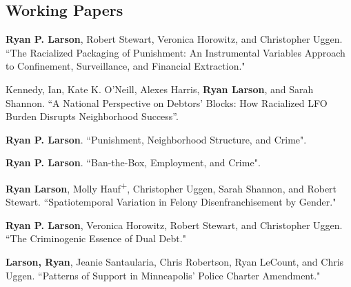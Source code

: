 \documentclass[letterpaper]{article}
\renewenvironment{itemize}{
  \begin{list}{}{
    \setlength{\leftmargin}{1.5em}
  }
}{
  \end{list}
}
\begin{document}
\subsection*{Working Papers}
\begin{itemize}

\item \textbf{Ryan P. Larson}, Robert Stewart, Veronica Horowitz, and Christopher Uggen. ``The Racialized Packaging of Punishment: An Instrumental Variables Approach to Confinement, Surveillance, and Financial Extraction." 
\item Kennedy, Ian, Kate K. O’Neill, Alexes Harris, \textbf{Ryan Larson}, and Sarah Shannon. “A National Perspective on Debtors’ Blocks: How Racialized LFO Burden Disrupts Neighborhood Success”.
\item \textbf{Ryan P. Larson}. ``Punishment, Neighborhood Structure, and Crime".
\item \textbf{Ryan P. Larson}. ``Ban-the-Box, Employment, and Crime".
\item \textbf{Ryan Larson}, Molly Hauf\textsuperscript{+}, Christopher Uggen, Sarah Shannon, and Robert Stewart. ``Spatiotemporal Variation in Felony Disenfranchisement by Gender."
\item \textbf{Ryan P. Larson}, Veronica Horowitz, Robert Stewart, and Christopher Uggen. ``The Criminogenic Essence of Dual Debt."
\item \textbf{Larson, Ryan}, Jeanie Santaularia, Chris Robertson, Ryan LeCount, and Chris Uggen.  ``Patterns of Support in Minneapolis’ Police Charter Amendment." 






\end{itemize}
\end{document}
